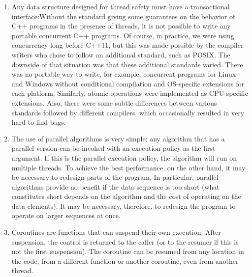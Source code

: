 \begin{enumerate}
\item 
Any data structure designed for thread safety must have a transactional interface:Without the standard giving some guarantees on the behavior of C++ programs in the presence of threads, it is not possible to write any portable concurrent C++ programs. Of course, in practice, we were using concurrency long before C++11, but this was made possible by the compiler writers who chose to follow an additional standard, such as POSIX. The downside of that situation was that these additional standards varied. There was no portable way to write, for example, concurrent programs for Linux and Windows without conditional compilation and OS-specific extensions for each platform. Similarly, atomic operations were implemented as CPU-specific extensions. Also, there were some subtle differences between various standards followed by different compilers, which occasionally resulted in very hard-to-find bugs.

\item 
The use of parallel algorithms is very simple: any algorithm that has a parallel version can be invoked with an execution policy as the first argument. If this is the parallel execution policy, the algorithm will run on multiple threads. To achieve the best performance, on the other hand, it may be necessary to redesign parts of the program. In particular, parallel algorithms provide no benefit if the data sequence is too short (what constitutes short depends on the algorithm and the cost of operating on the data elements). It may be necessary, therefore, to redesign the program to operate on larger sequences at once.

\item 
Coroutines are functions that can suspend their own execution. After suspension, the control is returned to the caller (or to the resumer if this is not the first suspension). The coroutine can be resumed from any location in the code, from a different function or another coroutine, even from another thread.

\end{enumerate}